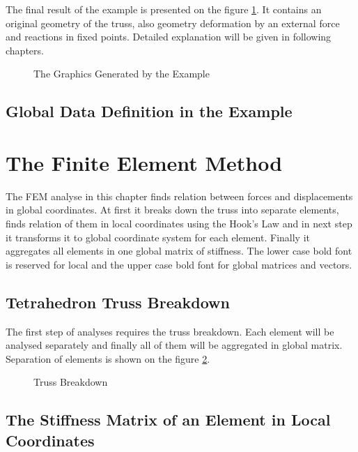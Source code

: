 \bigskip

The final result of the example is presented on the figure \ref{fig:final:graphics}. It contains an original geometry of the truss, also geometry deformation by an external force and reactions in fixed points. Detailed explanation will be given in following chapters.

\begin{figure}[H]
\centering

\caption{The Graphics Generated by the Example}
\label{fig:final:graphics}
\end{figure}

\subsection{Global Data Definition in the Example}



\section{The Finite Element Method}

The FEM analyse in this chapter finds relation between forces and displacements in global coordinates. At first it breaks down the truss into separate elements, finds relation of them in local coordinates using the Hook's Law and in next step it transforms it to global coordinate system for each element. Finally it aggregates all elements in one global matrix of stiffness. The lower case bold font is reserved for local and the upper case bold font for global matrices and vectors.

\subsection{Tetrahedron Truss Breakdown}

The first step of analyses requires the truss breakdown. Each element will be analysed separately and finally all of them will be aggregated in global matrix. Separation of elements is shown on the figure \ref{fig:breakdown}.

\begin{figure}[H]
\centering

\caption{Truss Breakdown}
\label{fig:breakdown}
\end{figure}

\subsection{The Stiffness Matrix of an Element in Local Coordinates}

